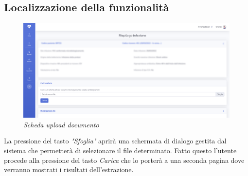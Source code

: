 \subsection{Localizzazione della funzionalità}
\begin{figure}[h!]
	\centering
	\includegraphics[width=.99\columnwidth]{images/feature_location.png}
	\caption{\textit{Scheda upload documento}}
	\label{fig:feature_location}
\end{figure}
La pressione del tasto \textit{"Sfoglia"} aprirà una schermata di dialogo gestita dal sistema che permetterà di selezionare il file determinato. Fatto questo l'utente procede alla pressione del tasto \textit{Carica} che lo porterà a una seconda pagina dove verranno mostrati i risultati dell'estrazione.
\newpage
